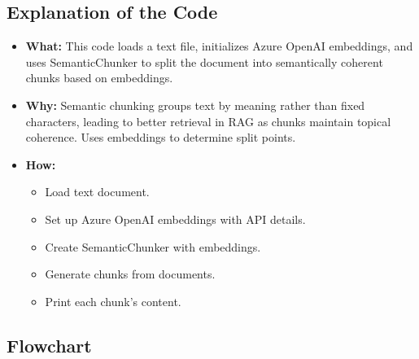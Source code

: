 \documentclass[11pt, a4paper]{article}
\begin{document}
\subsection{Explanation of the Code}
\begin{itemize}
    \item \textbf{What:} This code loads a text file, initializes Azure OpenAI embeddings, and uses SemanticChunker to split the document into semantically coherent chunks based on embeddings.
    \item \textbf{Why:} Semantic chunking groups text by meaning rather than fixed characters, leading to better retrieval in RAG as chunks maintain topical coherence. Uses embeddings to determine split points.
    \item \textbf{How:}
    \begin{itemize}
        \item Load text document.
        \item Set up Azure OpenAI embeddings with API details.
        \item Create SemanticChunker with embeddings.
        \item Generate chunks from documents.
        \item Print each chunk's content.
    \end{itemize}
\end{itemize}

\subsection{Flowchart}
\end{document}
